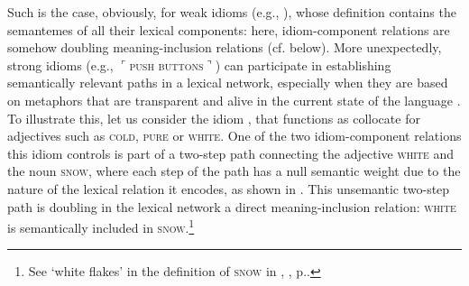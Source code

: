 Such is the case, obviously, for weak idioms (e.g., ), whose definition contains the semantemes of all their lexical components: here, idiom-component relations are somehow doubling meaning-inclusion relations (cf.  below). More unexpectedly, strong idioms (e.g., $\ulcorner$\textsc{push}  \textsc{buttons}$\urcorner$) can participate in establishing semantically relevant paths in a lexical network, especially when they are based on metaphors that are transparent and alive in the current state of the language \parencite{Alm-Arvius2006}. To illustrate this, let us consider the idiom , that functions as  collocate for adjectives such as \textsc{cold}, \textsc{pure} or \textsc{white}. One of the two idiom-component relations this idiom controls is part of a two-step path connecting the adjective \textsc{white} and the noun \textsc{snow}, where each step of the path has a null semantic weight due to the nature of the lexical relation it encodes, as shown in 	. This unsemantic two-step path is doubling in the lexical network a direct meaning-inclusion relation: \textsc{white} is semantically included in \textsc{snow}.\footnote{See `white flakes' in the definition of \textsc{snow} in , , p.\thinspace\pageref{ldef:defSNOW-n}.}

